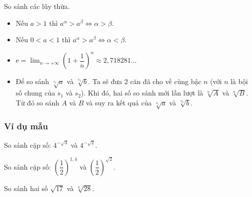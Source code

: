 \begin{dang}{So sánh các lũy thừa.}
	\begin{itemize}
		\item Nếu $a>1$ thì $a^{\alpha} >a^{\beta} \Leftrightarrow \alpha > \beta$. 
		\item Nếu $0<a<1$ thì $a^{\alpha} >a^{\beta} \Leftrightarrow \alpha < \beta$. 
		\item $\displaystyle \mathrm{e} = \lim_{n \to +\infty} \left (1+\dfrac{1}{n}\right )^n  \approx 2{,}718281 \dots$
		\item Để so sánh $\sqrt[s_1]{a}$ và $\sqrt[s_2]{b}$. Ta sẽ đưa $2$ căn đã cho về cùng bậc $n$ (với $n$ là bội số chung của $s_1$ và $s_2$). Khi đó, hai số so sánh mới lần lượt là $\sqrt[n]{A}$ và $\sqrt[n]{B}$. Từ đó so sánh $A$ và $B$ và suy ra kết quả của $\sqrt[s_1]{a}$ và $\sqrt[s_2]{b}$.
	\end{itemize} 
\end{dang}
\subsubsection{Ví dụ mẫu}
\begin{vd}%
	So sánh cặp số: $4^{-\sqrt{3}}$ và $4^{-\sqrt{2}}$.
\end{vd}
\begin{vd}%
	So sánh cặp số: $\left (\dfrac{1}{2}\right )^{1{,}4}$ và $\left (\dfrac{1}{2}\right )^{\sqrt{2}}$.
\end{vd}
\begin{vd}%
	So sánh hai số $\sqrt{17}$ và $\sqrt[3]{28}$.
\end{vd}

